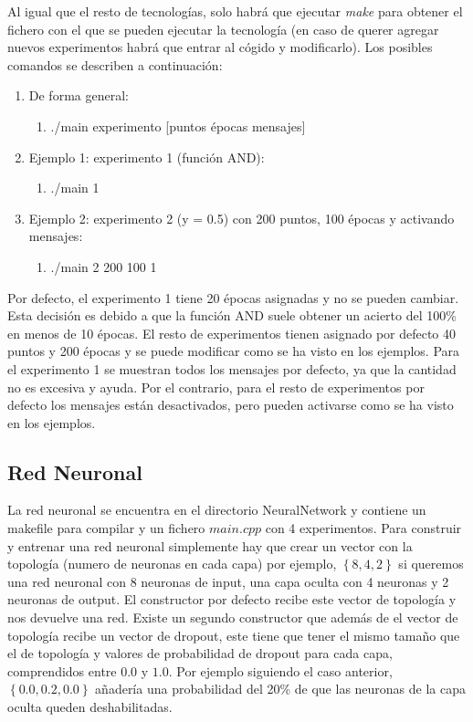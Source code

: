 Al igual que el resto de tecnologías, solo habrá que ejecutar \textit{make} para obtener el fichero con el que se pueden ejecutar la tecnología (en caso de querer agregar nuevos experimentos habrá que entrar al cógido y modificarlo). Los posibles comandos se describen a continuación:

\begin{enumerate}
    \item De forma general:
    \begin{enumerate}
        \item ./main experimento [puntos épocas mensajes]
    \end{enumerate}
    \item Ejemplo 1: experimento 1 (función AND):
    \begin{enumerate}
        \item ./main 1
    \end{enumerate}
    \item Ejemplo 2: experimento 2 (y = 0.5) con 200 puntos, 100 épocas y activando mensajes:
    \begin{enumerate}
        \item ./main 2 200 100 1
    \end{enumerate}
\end{enumerate}

Por defecto, el experimento 1 tiene 20 épocas asignadas y no se pueden cambiar. Esta decisión es debido a que la función AND suele obtener un acierto del 100\% en menos de 10 épocas. El resto de experimentos tienen asignado por defecto 40 puntos y 200 épocas y se puede modificar como se ha visto en los ejemplos. Para el experimento 1 se muestran todos los mensajes por defecto, ya que la cantidad no es excesiva y ayuda. Por el contrario, para el resto de experimentos por defecto los mensajes están desactivados, pero pueden activarse como se ha visto en los ejemplos.

\newpage
\subsection{Red Neuronal}

La red neuronal se encuentra en el directorio NeuralNetwork y contiene un makefile para compilar y un fichero $main.cpp$ con 4 experimentos.  Para construir y entrenar una red neuronal simplemente hay que crear un vector con la topología (numero de neuronas en cada capa) por ejemplo, $\left \{8, 4, 2 \right \}$ si queremos una red neuronal con 8 neuronas de input, una capa oculta con 4 neuronas y 2 neuronas de output. El constructor por defecto recibe este vector de topología y nos devuelve una red. Existe un segundo constructor que además de el vector de topología recibe un vector de dropout, este tiene que tener el mismo tamaño que el de topología y valores de probabilidad de dropout para cada capa, comprendidos entre $0.0$ y $1.0$. Por ejemplo siguiendo el caso anterior, $\left \{0.0, 0.2, 0.0 \right \}$ añadería una probabilidad del 20\% de que las neuronas de la capa oculta queden deshabilitadas.

